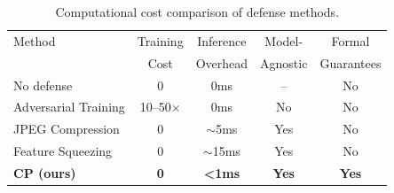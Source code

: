 \begin{table}[t]
\centering
\caption{Computational cost comparison of defense methods.}
\label{tab:cost}
\small
\begin{tabular}{lcccc}
\toprule
    Method & Training & Inference & Model- & Formal \\
           & Cost     & Overhead  & Agnostic & Guarantees \\
\midrule
    No defense & 0 & 0ms & -- & No \\
    Adversarial Training & 10--50$\times$ & 0ms & No & No \\
    JPEG Compression & 0 & $\sim$5ms & Yes & No \\
    Feature Squeezing & 0 & $\sim$15ms & Yes & No \\
    \textbf{CP (ours)} & \textbf{0} & \textbf{<1ms} & \textbf{Yes} & \textbf{Yes} \\
\bottomrule
\end{tabular}
\end{table}